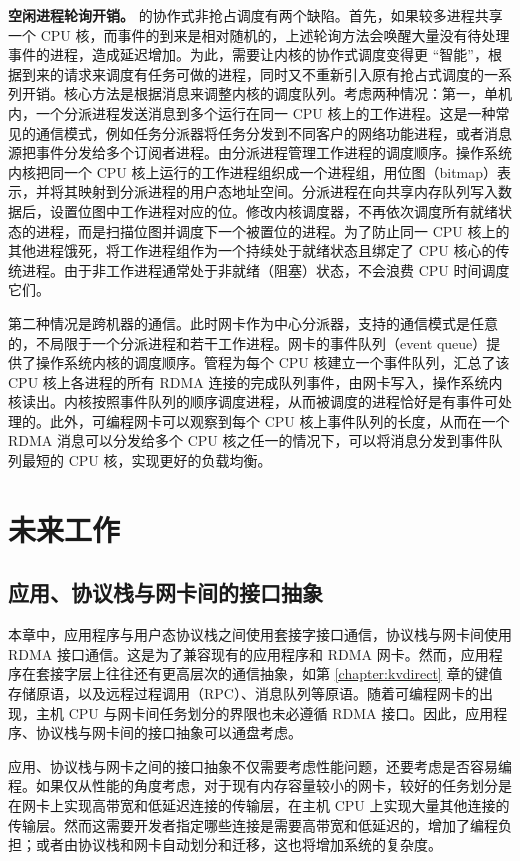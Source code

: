 \textbf{空闲进程轮询开销。}
\libipc{} 的协作式非抢占调度有两个缺陷。首先，如果较多进程共享一个 CPU 核，而事件的到来是相对随机的，上述轮询方法会唤醒大量没有待处理事件的进程，造成延迟增加。为此，需要让内核的协作式调度变得更 ``智能''，根据到来的请求来调度有任务可做的进程，同时又不重新引入原有抢占式调度的一系列开销。核心方法是根据消息来调整内核的调度队列。考虑两种情况：第一，单机内，一个分派进程发送消息到多个运行在同一 CPU 核上的工作进程。这是一种常见的通信模式，例如任务分派器将任务分发到不同客户的网络功能进程，或者消息源把事件分发给多个订阅者进程。由分派进程管理工作进程的调度顺序。操作系统内核把同一个 CPU 核上运行的工作进程组织成一个进程组，用位图（bitmap）表示，并将其映射到分派进程的用户态地址空间。分派进程在向共享内存队列写入数据后，设置位图中工作进程对应的位。修改内核调度器，不再依次调度所有就绪状态的进程，而是扫描位图并调度下一个被置位的进程。为了防止同一 CPU 核上的其他进程饿死，将工作进程组作为一个持续处于就绪状态且绑定了 CPU 核心的传统进程。由于非工作进程通常处于非就绪（阻塞）状态，不会浪费 CPU 时间调度它们。

第二种情况是跨机器的通信。此时网卡作为中心分派器，支持的通信模式是任意的，不局限于一个分派进程和若干工作进程。网卡的事件队列（event queue）提供了操作系统内核的调度顺序。管程为每个 CPU 核建立一个事件队列，汇总了该 CPU 核上各进程的所有 RDMA 连接的完成队列事件，由网卡写入，操作系统内核读出。内核按照事件队列的顺序调度进程，从而被调度的进程恰好是有事件可处理的。此外，可编程网卡可以观察到每个 CPU 核上事件队列的长度，从而在一个 RDMA 消息可以分发给多个 CPU 核之任一的情况下，可以将消息分发到事件队列最短的 CPU 核，实现更好的负载均衡。

\section{未来工作}

\subsection{应用、协议栈与网卡间的接口抽象}
\label{future:nic-interface}

本章中，应用程序与用户态协议栈之间使用套接字接口通信，协议栈与网卡间使用 RDMA 接口通信。这是为了兼容现有的应用程序和 RDMA 网卡。然而，应用程序在套接字层上往往还有更高层次的通信抽象，如第 \ref{chapter:kvdirect} 章的键值存储原语，以及远程过程调用（RPC）、消息队列等原语。随着可编程网卡的出现，主机 CPU 与网卡间任务划分的界限也未必遵循 RDMA 接口。因此，应用程序、协议栈与网卡间的接口抽象可以通盘考虑。

应用、协议栈与网卡之间的接口抽象不仅需要考虑性能问题，还要考虑是否容易编程。如果仅从性能的角度考虑，对于现有内存容量较小的网卡，较好的任务划分是在网卡上实现高带宽和低延迟连接的传输层，在主机 CPU 上实现大量其他连接的传输层。然而这需要开发者指定哪些连接是需要高带宽和低延迟的，增加了编程负担；或者由协议栈和网卡自动划分和迁移，这也将增加系统的复杂度。

